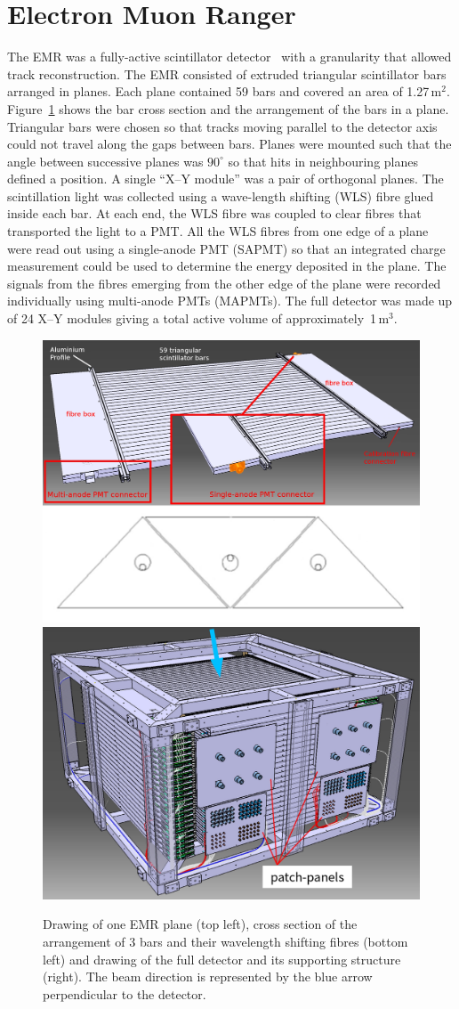 \graphicspath{{05-EMR/Figures/}}

\section{Electron Muon Ranger}
\label{Sect:EMR}

The EMR was a fully-active scintillator
detector~\cite{2016JInst..11T10007} with a granularity that allowed track reconstruction.
The EMR consisted of extruded triangular scintillator bars arranged in
planes.
Each plane contained 59 bars and covered an area of 1.27\,m$^2$.
Figure~\ref{fig:EMR} shows the bar cross section and the arrangement of the
bars in a plane.
Triangular bars were chosen so that tracks moving parallel to the
detector axis could not travel along the gaps between bars. 
Planes were mounted such that the angle between successive planes was
$90^{\circ}$ so that hits in neighbouring planes defined a position.
A single ``X--Y module'' was a pair of orthogonal planes.
The scintillation light was collected using a wave-length shifting
(WLS) fibre glued inside each bar.
At each end, the WLS fibre was coupled to clear fibres that
transported the light to a PMT.
All the WLS fibres from one edge of a plane were read out using a
single-anode PMT (SAPMT) so that an integrated charge measurement could be
used to determine the energy deposited in the plane.
The signals from the fibres emerging from the other edge of the plane
were recorded individually using multi-anode PMTs (MAPMTs). 
The full detector was made up of 24 X--Y modules giving a total active 
volume of approximately~1\,m$^3$.
\begin{figure}[htb!]
  \begin{center}
    \includegraphics[width=0.465\columnwidth]{EMR1.png}
    \hfill
    \includegraphics[width=0.515\columnwidth]{EMR2-edited}
  \end{center}
  \caption{
    Drawing of one EMR plane (top left), cross section of the
    arrangement of 3 bars and their wavelength shifting fibres (bottom
    left) and drawing of the full detector and its supporting
    structure (right).
    The beam direction is represented by the blue arrow perpendicular to the detector.
  }
  \label{fig:EMR}
\end{figure}

